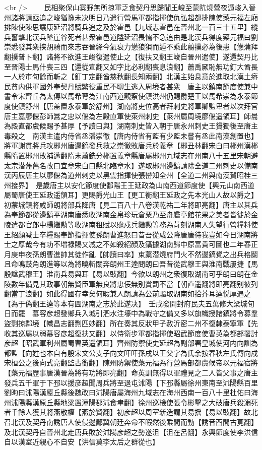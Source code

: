 <br />
　　民相聚保山寨野無所掠軍乏食契丹思歸聞王峻至蒙阬燒營夜遁峻入晉州諸將請亟追之峻猶豫未决明日乃遣行營馬軍都指揮使仇弘超都排陳使藥元福左廂排陳使陳思讓康延沼將騎兵追之及於霍邑【九域志霍邑在晉州北一百三十五里】縱兵奮擊北漢兵墜崖谷死者甚衆霍邑道隘延沼畏懦不急追由是北漢兵得度藥元福曰劉崇悉發其衆挟胡騎而來志吞晉絳今氣衰力憊狼狽而遁不乘此翦撲必為後患【憊蒲拜翻撲普卜翻】諸將不欲進王峻復遣使止之【復扶又翻王峻自晉州遣使】遂還契丹比至晉陽士馬什喪三四【還從宣翻又如字比必利翻喪息浪翻】蕭禹厥恥無功釘大酋長一人於市旬餘而斬之【釘丁定翻酋慈秋翻長知兩翻】北漢主始息意於進取北漢土瘠民貧内供軍國外奉契丹賦繁役重民不聊生逃入周境者甚衆　唐主以鎮南節度使兼中書令宋齊丘為太傅以馬希萼為江南西道觀察使鎮洪州仍賜爵楚王以馬希崇為永泰節度使鎮舒州【唐盖置永泰軍於舒州】湖南將吏位高者拜刺史將軍卿監卑者以次拜官唐主嘉廖偃彭師暠之忠以偃為左殿直軍使萊州刺史【萊州屬周境廖偃遥領耳】師暠為殿直都虞候賜予甚厚【予讀曰與】湖南刺史皆入朝于唐永州刺史王贇獨後至唐主毒殺之　南漢主遣内侍省丞潘崇徹【唐内侍省有監有少監未嘗有丞此南漢創置也】將軍謝貫將兵攻郴州唐邊鎬發兵救之崇徹敗唐兵於義章【郴丑林翻宋白曰郴州漢郴縣隋置郴州敗補邁翻隋末蕭銑分郴置義章縣唐屬郴州九域志在州南八十五里宋朝避太宗潜藩舊名改曰宜章宋白曰縣北臨章水】遂取郴州邊鎬請除全道二州刺史以備南漢丙辰唐主以廖偃為道州刺史以黑雲指揮使張巒知全州【全道二州與南漢賀昭桂三州接界】　是歲唐主以安化節度使鄱陽王王延政為山南西道節度使【興元山南西道屬蜀唐使王延政遥領耳】更賜爵光山王【更工衡翻王延政之先本光山人故以爵之】初蒙城鎮將咸師朗將部兵降唐【見二百八十八卷漢乾祐二年將即亮翻】唐主以其兵為奉節都從邊鎬平湖南唐悉收湖南金帛珍玩倉粟乃至舟艦亭館花果之美者皆徙於金陵遣都官郎中楊繼勲等收湖南租賦以贍戍兵繼勲等務為苛刻湖南人失望行營糧料使王紹顔减士卒糧賜奉節指揮使孫朗曹進怒曰昔吾從咸公降唐唐待我豈如今日湖南將士之厚哉今有功不增禄賜又减之不如殺紹顔及鎬據湖南歸中原富貴可圖也二年春正月庚申夜孫朗曹進帥其徒作亂【帥讀曰率】束藁潜燒府門火不然邊鎬覺之出兵格鬬且命鳴鼓角朗進等以為將曉斬關奔朗州王逵問朗曰吾昔從武穆王與淮南戰屢捷【馬殷諡武穆王】淮南兵易與耳【易以䜴翻】今欲以朗州之衆復取湖南可乎朗曰朗在金陵數年備見其政事朝無賢臣軍無良將忠佞無别賞罰不當【朝直遥翻將即亮翻别彼列翻當丁浪翻】如此得國存幸矣何暇兼人朗請為公前驅取湖南如拾芥耳逵悦厚遇之【為于偽翻王逵等本有圖湖南之志於此遂决】　壬戌發開封府民夫五萬修大梁城旬日而罷　慕容彦超發鄉兵入城引泗水注壕中為戰守之備又多以旗幟授諸鎮將令募羣盜剽掠鄰境【幟昌志翻剽匹妙翻】所在奏其反狀甲子赦沂密二州不復隸泰寧軍【先收其巡屬以弱慕容彦超復扶又翻】以侍衛步軍都指揮使昭武節度使曹英為都部署討彦超【昭武軍利州屬蜀曹英遥領耳】齊州防禦使史延超為副部署皇城使河内向訓為都監【向姓也本自有殷宋文公支子向文旰旰孫戌以王父字為氏余按春秋左氏傳向戍宋桓公之後向式亮翻監古銜翻】陳州防禦使藥元福為行營馬部都虞候帝以元福宿將【藥元福歷事唐漢晉為將有功將即亮翻】命英訓無得以軍禮見之二人皆父事之唐主發兵五千軍于下邳以援彦超聞周兵將至退屯沭陽【下邳縣屬徐州東南至沭陽縣百里劉昫曰沭陽漢廩丘縣後魏改曰沭陽唐屬海州九域志在海州西南一百八十里杜佑曰海州沭陽縣漢原丘縣地梁置潼陽郡沭食聿翻】徐州巡檢使張令彬擊之大破唐兵殺溺死者千餘人獲其將燕敬權【燕於賢翻】初彦超以周室新造謂其易揺【易以䜴翻】故北召北漢及契丹南誘唐人使侵邊鄙冀朝廷奔命不暇然後乘間而動【誘音酉間古莧翻】及北漢契丹自晉州北走唐兵敗於沭陽彦超之勢遂沮【沮在呂翻】永興節度使李洪信自以漢室近親心不自安【洪信莫李太后之群從也】